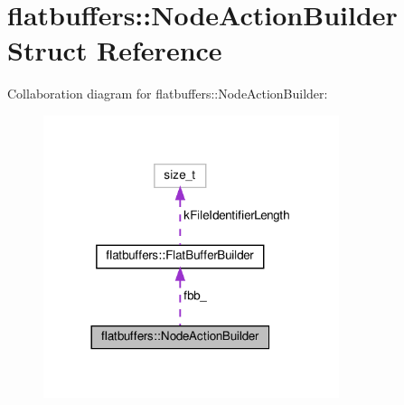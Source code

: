 \hypertarget{structflatbuffers_1_1NodeActionBuilder}{}\section{flatbuffers\+:\+:Node\+Action\+Builder Struct Reference}
\label{structflatbuffers_1_1NodeActionBuilder}


Collaboration diagram for flatbuffers\+:\+:Node\+Action\+Builder\+:
\nopagebreak
\begin{figure}[H]
\begin{center}
\leavevmode
\includegraphics[width=245pt]{structflatbuffers_1_1NodeActionBuilder__coll__graph}
\end{center}
\end{figure}
